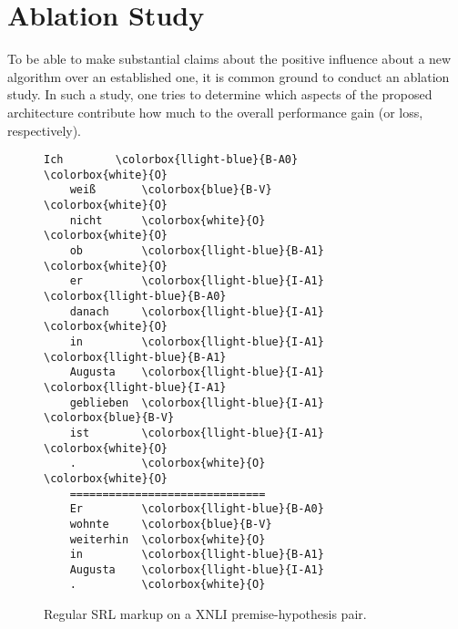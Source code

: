{%








\section{Ablation Study}
\label{sec:ablation}

To be able to make substantial claims about the positive influence about a new algorithm over an
established one, it is common ground to conduct an ablation study. In such a study, one tries to
determine which aspects of the proposed architecture contribute how much to the overall performance
gain (or loss, respectively).

\begin{wrapfigure}[17]{r}{0pt}
\begin{minipage}{0.45\linewidth}
  \centering
    \begin{srl}
      \begin{BVerbatim}[commandchars=\\\{\}, fontsize=\footnotesize]
    Ich        \colorbox{llight-blue}{B-A0}         \colorbox{white}{O}
    weiß       \colorbox{blue}{B-V}          \colorbox{white}{O}
    nicht      \colorbox{white}{O}            \colorbox{white}{O}
    ob         \colorbox{llight-blue}{B-A1}         \colorbox{white}{O}
    er         \colorbox{llight-blue}{I-A1}         \colorbox{llight-blue}{B-A0}
    danach     \colorbox{llight-blue}{I-A1}         \colorbox{white}{O}
    in         \colorbox{llight-blue}{I-A1}         \colorbox{llight-blue}{B-A1}
    Augusta    \colorbox{llight-blue}{I-A1}         \colorbox{llight-blue}{I-A1}
    geblieben  \colorbox{llight-blue}{I-A1}         \colorbox{blue}{B-V}
    ist        \colorbox{llight-blue}{I-A1}         \colorbox{white}{O}
    .          \colorbox{white}{O}            \colorbox{white}{O}
    ==============================
    Er         \colorbox{llight-blue}{B-A0}
    wohnte     \colorbox{blue}{B-V}
    weiterhin  \colorbox{white}{O}
    in         \colorbox{llight-blue}{B-A1}
    Augusta    \colorbox{llight-blue}{I-A1}
    .          \colorbox{white}{O}
      \end{BVerbatim}
      \caption{Regular SRL markup on a XNLI premise-hypothesis pair.}
      \label{srl:normal}
    \end{srl}
\end{minipage}
\end{wrapfigure}

}
